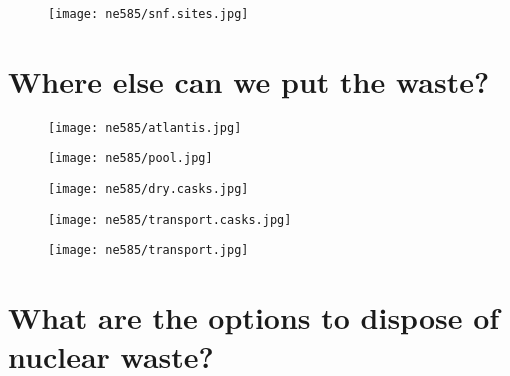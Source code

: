 \documentclass[aspectratio=1610,pdftex,dvipsnames,compress,xcolor={dvipsnames}]{beamer}
\begin{document}
\begin{frame}{}
    \begin{figure}
        \centering
        \texttt{[image: ne585/snf.sites.jpg]}
    \end{figure}
\end{frame}


\section{Where else can we put the waste?}


\addtocounter{framenumber}{-1} 
\begin{frame}{}
    \begin{figure}
        \centering
        \texttt{[image: ne585/atlantis.jpg]}
    \end{figure}
\end{frame}


\begin{frame}{}
    \begin{figure}
        \centering
        \texttt{[image: ne585/pool.jpg]}
    \end{figure}
\end{frame}


\begin{frame}{}
    \begin{figure}
        \centering
        \texttt{[image: ne585/dry.casks.jpg]}
    \end{figure}
\end{frame}


\begin{frame}{}
    \begin{figure}
        \centering
        \texttt{[image: ne585/transport.casks.jpg]}
    \end{figure}
\end{frame}


\begin{frame}{}
    \begin{figure}
        \centering
        \texttt{[image: ne585/transport.jpg]}
    \end{figure}
\end{frame}


\section{What are the options to dispose of nuclear waste?}
\end{document}
